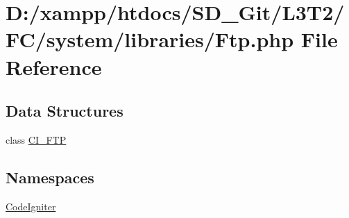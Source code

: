 \hypertarget{system_2libraries_2_ftp_8php}{}\section{D\+:/xampp/htdocs/\+S\+D\+\_\+\+Git/\+L3\+T2/\+F\+C/system/libraries/\+Ftp.php File Reference}
\label{system_2libraries_2_ftp_8php}
\subsection*{Data Structures}
\begin{DoxyCompactItemize}
\item 
class \hyperlink{class_c_i___f_t_p}{C\+I\+\_\+\+F\+T\+P}
\end{DoxyCompactItemize}
\subsection*{Namespaces}
\begin{DoxyCompactItemize}
\item 
 \hyperlink{namespace_code_igniter}{Code\+Igniter}
\end{DoxyCompactItemize}
